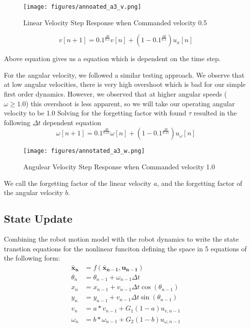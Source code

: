 \documentclass[14pt,letterpaper]{article}
\newcommand{\vect}[1]{\bm{#1}}  %
\begin{document}
\begin{figure}[H]
\centering
\texttt{[image: figures/annoated\_a3\_v.png]}
\caption{Linear Velocity Step Response when Commanded velocity 0.5}
\label{fig:linear vel}
\end{figure}

\begin{equation}
  v[n+1] = 0.1 ^ {\frac{\Delta t}{0.5}}v[n] + (1 - 0.1 ^ {\frac{\Delta t}{0.5}})u_x[n]
  \label{eq:Linear vel}
\end{equation}

Above equation gives us a equation which is dependent on the time step.

For the angular velocity, we followed a similar testing approach. We observe that at low angular velocities, there is very high overshoot which is bad for our simple first order dynamics.
However, we observed that at higher angular speeds ($\omega \geq 1.0$) this overshoot is less apparent, so we will take our operating angular velocity to be 1.0
Solving for the forgetting factor with found $\tau$ resulted in the following $\Delta t$ dependent equation
\begin{equation}
  \omega[n+1] = 0.1^{\frac{\Delta t}{0.15}} \omega[n] + (1-0.1^{\frac{\Delta t}{0.15}}) u_{\omega}[n]
  \label{eq:angular vel}
\end{equation}

\begin{figure}[H]
\centering
\texttt{[image: figures/annotated\_a3\_w.png]}
\caption{Angulear Velocity Step Response when Commanded velocity 1.0}
\label{fig:angulvel}
\end{figure}

We call the forgetting factor of the linear velocity $a$, and the forgetting factor of the angular velocity $b$.

\subsection{State Update}

Combining the robot motion model with the robot dynamics to write the state transtion equations for the nonlinear funciton defining the space in 5 equations of the following form:
\begin{align*}
  \vect{\bar{x}_n} &= f(\vect{\bar{x}_{n-1}}, \vect{u_{n-1}}) \\
  \theta_n &= \theta_{n-1} + \omega_{n-1} \Delta t \\
  x_n &= x_{n-1} + v_{n-1} \Delta t \cos(\theta_{n-1}) \\
  y_n &= y_{n-1} + v_{n-1} \Delta t \sin(\theta_{n-1}) \\
  v_n &= a * v_{n-1} + G_1 (1-a) u_{v, n-1} \\
  \omega_n &= b * \omega_{n-1} + G_2 (1-b) u_{\omega, n-1} \\
\end{align*}
\end{document}
